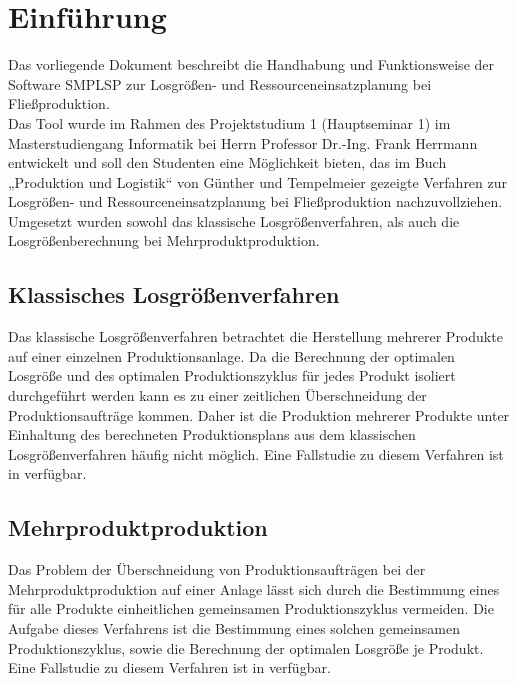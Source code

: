 \section{Einführung}
\label{ch:einfuehrung}
Das vorliegende Dokument beschreibt die Handhabung und Funktionsweise der Software \gls{SMPLSP} zur Losgrößen- und Ressourceneinsatzplanung bei Fließproduktion. \\
Das Tool wurde im Rahmen des Projektstudium 1 (Hauptseminar 1) im Masterstudiengang Informatik bei Herrn Professor Dr.-Ing. Frank Herrmann entwickelt und soll den Studenten
eine Möglichkeit bieten, das im Buch „Produktion und Logistik“ von Günther und Tempelmeier \cite{Templ09} gezeigte Verfahren zur Losgrößen- und Ressourceneinsatzplanung bei Fließproduktion nachzuvollziehen.
Umgesetzt wurden sowohl das klassische Losgrößenverfahren, als auch die Losgrößenberechnung bei Mehrproduktproduktion.

\subsection{Klassisches Losgrößenverfahren}
Das klassische Losgrößenverfahren betrachtet die Herstellung mehrerer Produkte auf einer
einzelnen Produktionsanlage. Da die Berechnung der optimalen Losgröße und des optimalen
Produktionszyklus für jedes Produkt isoliert durchgeführt werden kann es zu einer zeitlichen Überschneidung der Produktionsaufträge kommen. Daher ist die Produktion mehrerer Produkte unter Einhaltung des berechneten Produktionsplans aus dem klassischen Losgrößenverfahren häufig nicht möglich. Eine Fallstudie zu diesem Verfahren ist in \cite{Templ09} verfügbar.

\subsection{Mehrproduktproduktion}
Das Problem der Überschneidung von Produktionsaufträgen bei der Mehrproduktproduktion auf einer Anlage lässt sich durch die Bestimmung eines für alle Produkte einheitlichen gemeinsamen Produktionszyklus vermeiden. Die Aufgabe dieses Verfahrens ist die Bestimmung eines solchen gemeinsamen Produktionszyklus, sowie die Berechnung der optimalen Losgröße je Produkt. Eine Fallstudie zu diesem Verfahren ist in \cite{Templ09} verfügbar.
\pagebreak